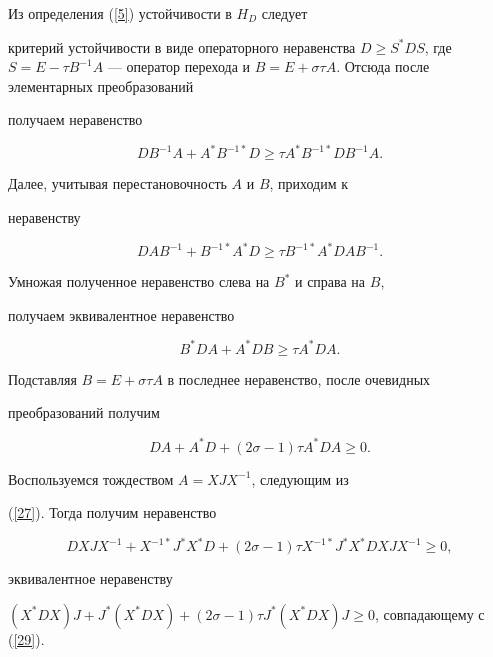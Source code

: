 \begin{pf}


Из определения (\ref{5}) устойчивости в $H_{D}$ следует


критерий устойчивости в виде операторного неравенства $D \geqslant


S^* DS$, где $S=E-\tau B^{- 1} A$ --- оператор перехода и $B


=E+\sigma \tau A$. Отсюда после элементарных преобразований


получаем неравенство


$$


DB^{- 1} A+A^* B^{- 1*} D \geqslant \tau A^* B^{- 1*} DB^{-


1} A.


$$


Далее, учитывая перестановочность $A$ и $B$, приходим к


неравенству


$$


DAB^{- 1}+B^{- 1*} A^* D \geqslant \tau B^{- 1*} A^* DAB^{-1}.


$$


Умножая полученное неравенство слева на $B ^*$ и справа на $B$,


получаем эквивалентное неравенство


$$


B^* DA+A^* DB \geqslant \tau A^* DA.


$$


Подставляя $B=E+\sigma \tau A$ в последнее неравенство, после очевидных


преобразований получим


$$


DA+A^* D+(2\sigma-1)\tau A^* DA \geqslant 0.


$$


Воспользуемся тождеством $ A=XJX^{- 1}$, следующим из


(\ref{27}). Тогда получим неравенство


$$


DXJX^{- 1}+X^{- 1*} J^* X^* D+(2\sigma-1)\tau X^{- 1*}


J^* X^* DXJX^{- 1} \geqslant 0,


$$


эквивалентное неравенству


$(X^* DX)J+J^* (X^* DX)+(2\sigma-1)\tau J^* (X^* DX)J


\geqslant 0$, совпадающему с (\ref{29}).


\end{pf}





